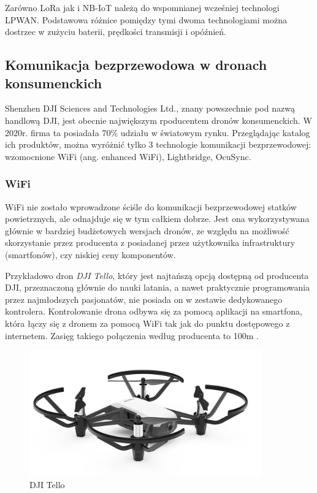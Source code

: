 \hspace{1cm}Zarówno LoRa jak i NB-IoT należą do wspomnianej wcześniej technologi LPWAN. Podstawowa różnice pomiędzy tymi dwoma technologiami można dostrzec w zużyciu baterii, prędkości transmisji i opóźnień.

\subsection{Komunikacja bezprzewodowa w dronach konsumenckich}
\hspace{1cm}Shenzhen DJI Sciences and Technologies Ltd., znany powszechnie pod nazwą handlową DJI, jest obecnie największym rpoducentem dronów konsumenckich. W 2020r. firma ta posiadała 70\% udziału w światowym rynku. \cite{dji-wiki} Przeglądając katalog ich produktów, można wyróżnić tylko 3 technologie komunikacji bezprzewodowej: wzomocnione WiFi (ang. enhanced WiFi), Lightbridge, OcuSync.

\subsubsection{WiFi}
\hspace{1cm}WiFi nie zostało wprowadzone ściśle do komunikacji bezprzewodowej statków powietrznych, ale odnajduje się w tym całkiem dobrze. Jest ona wykorzystywana głównie w bardziej budżetowych wersjach dronów, ze względu na możliwość skorzystanie przez producenta z posiadanej przez użytkownika infrastruktury (smartfonów), czy niskiej ceny komponentów.

\hspace{1cm}Przykładowo dron \emph{DJI Tello}, który jest najtańszą opcją dostępną od producenta DJI, przeznaczoną głównie do nauki latania, a nawet praktycznie programowania przez najmłodszych pasjonatów, nie posiada on w zestawie dedykowanego kontrolera. Kontrolowanie drona odbywa się za pomocą aplikacji na smartfona, która łączy się z dronem za pomocą WiFi tak jak do punktu dostępowego z internetem. Zasięg takiego połączenia według producenta to 100m \cite{dji-store}.


\begin{figure}[!htbp]
  \centering
  \includegraphics[width=10cm]{./Obrazy/dji-tello.jpg}
  \caption{DJI Tello}
  \end{figure}

